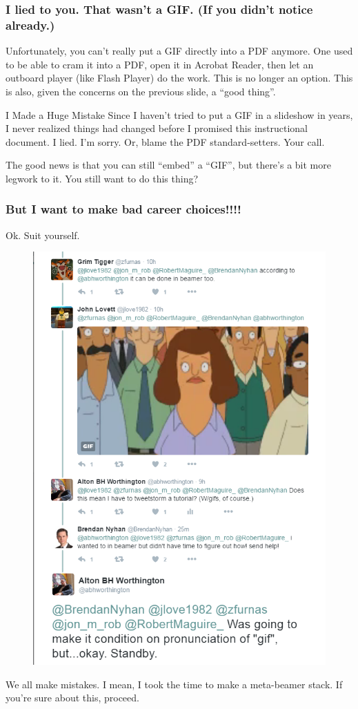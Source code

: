 \documentclass{beamer}
\begin{document}
\begin{frame}
	\frametitle{I lied to you. That wasn't a GIF. (If you didn't notice already.)}
	Unfortunately, you can't really put a GIF directly into a PDF anymore. One used to be able to cram it into a PDF, open it in Acrobat Reader, then let an outboard player (like Flash Player) do the work. This is no longer an option. This is also, given the concerns on the previous slide, a ``good thing''.
	\begin{block}{I Made a Huge Mistake}
		Since I haven't tried to put a GIF in a slideshow in years, I never realized things had changed before I promised this instructional document. I lied. I'm sorry. Or, blame the PDF standard-setters. Your call.
	\end{block}
	The good news is that you can still ``embed'' a ``GIF'', but there's a bit more legwork to it. You still want to do this thing?
\end{frame}

\begin{frame}
	\frametitle{But I want to make bad career choices!!!!}
	Ok. Suit yourself.
	\begin{figure}
		\centering
		\includegraphics[scale=.25]{genesis.PNG}
	\end{figure}
	We all make mistakes. \pause I mean, I took the time to make a meta-beamer stack. If you're sure about this, proceed.
\end{frame}
\end{document}

